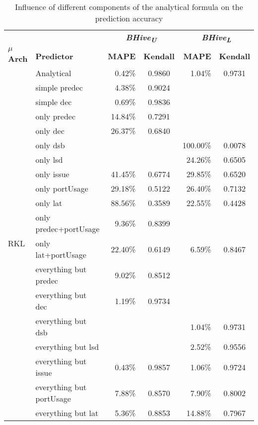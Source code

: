 \documentclass[sigconf,nonacm]{acmart}
\newcommand{\bhivel}{\emph{BHive\textsubscript{L}}\xspace}
\newcommand{\bhiveu}{\emph{BHive\textsubscript{U}}\xspace}
\begin{document}
\begin{table}
\caption{Influence of different components of the analytical formula on the prediction accuracy}
\begin{center}
\begin{tabular}{llrcrc}
\toprule
& & \multicolumn{2}{c}{\textbf{\bhiveu}} & \multicolumn{2}{c}{\textbf{\bhivel}}\\  \cmidrule(lr){3-4}\cmidrule(lr){5-6}
\textbf{{$\mu$}Arch}  & \textbf{Predictor} & \textbf{MAPE} & \textbf{Kendall} & \textbf{MAPE} & \textbf{Kendall} \\
\midrule
\multirow{19}{*}{RKL} & Analytical & 0.42\% & 0.9860 & 1.04\% & 0.9731\\
                      & simple predec  & 4.38\% & 0.9024 & & \\
                      & simple dec  & 0.69\% & 0.9836 & & \\
                      & only predec  & 14.84\% & 0.7291 & & \\
                      & only dec  & 26.37\% & 0.6840 & & \\
                      & only dsb  & & & 100.00\% & 0.0078\\
                      & only lsd  & & & 24.26\% & 0.6505\\
                      & only issue  & 41.45\% & 0.6774 & 29.85\% & 0.6520\\
                      & only portUsage  & 29.18\% & 0.5122 & 26.40\% & 0.7132\\
                      & only lat  & 88.56\% & 0.3589 & 22.55\% & 0.4428\\
                      & only predec+portUsage  & 9.36\% & 0.8399 & & \\
                      & only lat+portUsage  & 22.40\% & 0.6149 & 6.59\% & 0.8467\\
                      & everything but predec  & 9.02\% & 0.8512 & & \\
                      & everything but dec  & 1.19\% & 0.9734 & & \\
                      & everything but dsb  & & & 1.04\% & 0.9731\\
                      & everything but lsd  & & & 2.52\% & 0.9556\\
                      & everything but issue  & 0.43\% & 0.9857 & 1.06\% & 0.9724\\
                      & everything but portUsage  & 7.88\% & 0.8570 & 7.90\% & 0.8002\\
                      & everything but lat  & 5.36\% & 0.8853 & 14.88\% & 0.7967\\

\end{tabular}
\end{center}
\end{table}
\end{document}

